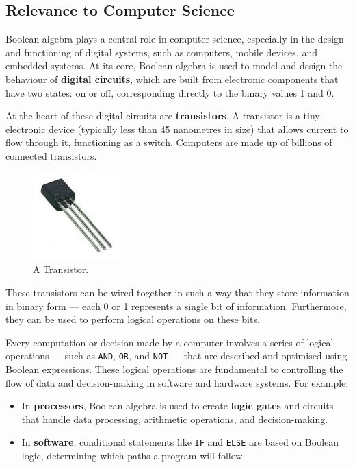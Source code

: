 \subsection*{Relevance to Computer Science}
Boolean algebra plays a central role in computer science, especially in the design and functioning of digital systems, such as computers, mobile devices, and embedded systems. At its core, Boolean algebra is used to model and design the behaviour of \textbf{digital circuits}, which are built from electronic components that have two states: on or off, corresponding directly to the binary values 1 and 0.

At the heart of these digital circuits are \textbf{transistors}. A transistor is a tiny electronic device (typically less than 45 nanometres in size) that allows current to flow through it, functioning as a switch. Computers are made up of billions of connected transistors.

\begin{figure}[h]
    \centering
    \includegraphics[width = 0.3\textwidth]{figure/transistor.png} %
    \caption{A Transistor.}
    \label{fig:transistor}
\end{figure}

These transistors can be wired together in such a way that they store information in binary form — each 0 or 1 represents a single bit of information. Furthermore, they can be used to perform logical operations on these bits.

Every computation or decision made by a computer involves a series of logical operations — such as \texttt{AND}, \texttt{OR}, and \texttt{NOT} — that are described and optimised using Boolean expressions. These logical operations are fundamental to controlling the flow of data and decision-making in software and hardware systems. For example:

\begin{itemize}
    \item In \textbf{processors}, Boolean algebra is used to create \textbf{logic gates} and circuits that handle data processing, arithmetic operations, and decision-making.
    \item In \textbf{software}, conditional statements like \texttt{IF} and \texttt{ELSE} are based on Boolean logic, determining which paths a program will follow.
\end{itemize}

